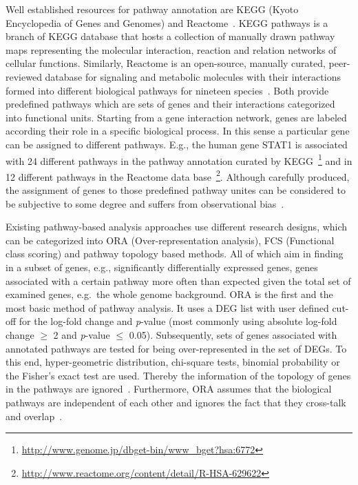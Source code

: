\documentclass[10pt,a4paper,twocolumn]{article}
\begin{document}
Well established resources for pathway annotation are KEGG (Kyoto
Encyclopedia of Genes and Genomes)\cite{Kegg} and
Reactome~\cite{Reactome}. KEGG pathways is a branch of KEGG database
that hosts a collection of manually drawn pathway maps representing
the molecular interaction, reaction and relation networks of cellular
functions. Similarly, Reactome is an open-source, manually curated,
peer-reviewed database for signaling and metabolic molecules with
their interactions formed into different biological pathways for
nineteen species~\cite{Reactome}. Both provide predefined pathways
which are sets of genes and their interactions categorized into
functional units. Starting from a gene interaction network, genes are
labeled according their role in a specific biological process. In this
sense a particular gene can be assigned to different pathways. E.g.,
the human gene STAT1 is associated with 24 different pathways in the
pathway annotation curated by
KEGG~\footnote{\url{http://www.genome.jp/dbget-bin/www_bget?hsa:6772}}
and in 12 different pathways in the Reactome data
base~\footnote{\url{http://www.reactome.org/content/detail/R-HSA-629622}}.
Although carefully produced, the assignment of genes to those
predefined pathway unites can be considered to be subjective to some
degree and suffers from observational bias~\cite{schnoes2013biases}.

Existing pathway-based analysis approaches use different research
designs, which can be categorized into ORA (Over-representation
analysis), FCS (Functional class scoring) and pathway topology based
methods. All of which aim in finding in a subset of genes, e.g.,
significantly differentially expressed genes, genes associated with a
certain pathway more often than expected given the total set of
examined genes, e.g.~the whole genome background.  ORA is the first
and the most basic method of pathway analysis. It uses a DEG list with
user defined cut-off for the log-fold change and \textit{p}-value
(most commonly using absolute log-fold change $\geq$ 2 and
\textit{p}-value $\leq$ 0.05). Subsequently, sets of genes associated
with annotated pathways are tested for being over-represented in the
set of DEGs. To this end, hyper-geometric distribution, chi-square
tests, binomial probability or the Fisher’s exact test are
used. Thereby the information of the topology of genes in the pathways
are ignored~\cite{Bayer}. Furthermore, ORA assumes that the biological
pathways are independent of each other and ignores the fact that they
cross-talk and overlap~\cite{Khatri2012,Campos}.
\end{document}
